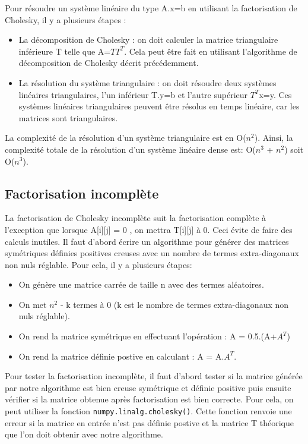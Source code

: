 \documentclass{article}
\begin{document}
Pour résoudre un système linéaire du type A.x=b en utilisant la factorisation de Cholesky, il y a plusieurs étapes : 
\begin{itemize}
    \item La décomposition de Cholesky : on doit calculer la matrice triangulaire inférieure T telle que A=$TT^{T}$. Cela peut être fait en utilisant l'algorithme de décomposition de Cholesky décrit précédemment.
    \item La résolution du système triangulaire : on doit résoudre deux systèmes linéaires triangulaires, l'un inférieur T.y=b et l'autre supérieur $T^{T}$x=y. Ces systèmes linéaires triangulaires peuvent être résolus en temps linéaire, car les matrices sont triangulaires. 
\end{itemize}
La complexité de la résolution d'un système triangulaire est en O($n^2$). Ainsi, la complexité totale de la résolution d'un système linéaire dense est: O($n^3$ + $n^2$) soit O($n^3$). 

\subsection{Factorisation incomplète}
\label{ssec:factor_incompl}
La factorisation de Cholesky incomplète suit la factorisation complète à l'exception que lorsque A[i][j] = 0 , on mettra T[i][j] à 0. Ceci évite de faire des calculs inutiles. 
Il faut d'abord écrire un algorithme pour générer des matrices symétriques définies positives creuses avec un nombre de termes extra-diagonaux non nuls réglable. Pour cela, il y a plusieurs étapes:
\begin{itemize}
    \item On génère une matrice carrée de taille n avec des termes aléatoires.
    \item On met $n^2$ - k termes à 0 (k est le nombre de termes extra-diagonaux non nuls réglable).
    \item On rend la matrice symétrique en effectuant l'opération : A = 0.5.(A+$A^{T}$)
    \item On rend la matrice définie postive en calculant : A = A.$A^{T}$.

\end{itemize}

Pour tester la factorisation incomplète, il faut d'abord tester si la matrice générée par notre algorithme est bien creuse symétrique et définie positive puis ensuite vérifier si la matrice obtenue après factorisation est bien correcte. 
Pour cela, on peut utiliser la fonction \verb|numpy.linalg.cholesky()|. Cette fonction renvoie une erreur si la matrice en entrée n'est pas définie postive et la matrice T théorique que l'on doit obtenir avec notre algorithme.
\end{document}

